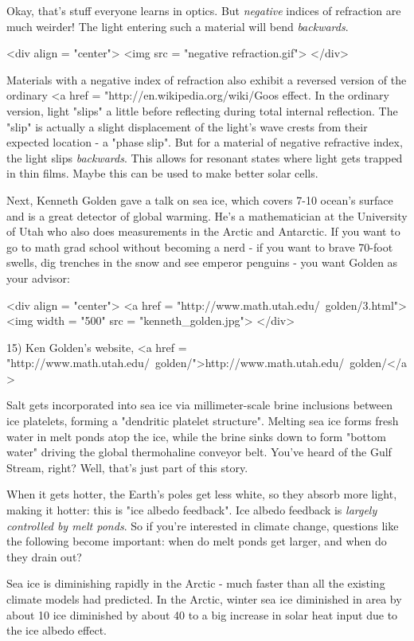 Okay, that's stuff everyone learns in optics.  But \emph{negative}
indices of refraction are much weirder!  The light entering such a
material will bend \emph{backwards}.

<div align = "center">
<img src = "negative refraction.gif">
</div>

Materials with a negative index of refraction also exhibit a reversed
version of the ordinary <a href =
"http://en.wikipedia.org/wiki/Goos%
effect.  In the ordinary version, light "slips" a little
before reflecting during total internal reflection.  The
"slip" is actually a slight displacement of the light's wave
crests from their expected location - a "phase slip".  But
for a material of negative refractive index, the light slips
\emph{backwards}.  This allows for resonant states where light gets
trapped in thin films.  Maybe this can be used to make better solar
cells.

Next, Kenneth Golden gave a talk on sea ice, which covers 7-10%
ocean's surface and is a great detector of global warming.  He's a
mathematician at the University of Utah who also does measurements in
the Arctic and Antarctic.  If you want to go to math grad school
without becoming a nerd - if you want to brave 70-foot swells, dig
trenches in the snow and see emperor penguins - you want Golden as
your advisor:

<div align = "center">
<a href = "http://www.math.utah.edu/~golden/3.html">
<img width = "500" src = "kenneth_golden.jpg">
</div>

15) Ken Golden's website, <a href =
"http://www.math.utah.edu/~golden/">http://www.math.utah.edu/~golden/</a>

Salt gets incorporated into sea ice via millimeter-scale brine
inclusions between ice platelets, forming a "dendritic platelet
structure".  Melting sea ice forms fresh water in melt ponds atop the
ice, while the brine sinks down to form "bottom water" driving the
global thermohaline conveyor belt.  You've heard of the Gulf Stream,
right?  Well, that's just part of this story.

When it gets hotter, the Earth's poles get less white, so they absorb
more light, making it hotter: this is "ice albedo feedback".  Ice
albedo feedback is \emph{largely controlled by melt ponds}.  So if you're
interested in climate change, questions like the following become 
important: when do melt ponds get larger, and when do they drain out?

Sea ice is diminishing rapidly in the Arctic - much faster than all
the existing climate models had predicted.   In the Arctic, winter sea
ice diminished in area by about 10%
ice diminished by about 40%
to a big increase in solar heat input due to the ice
albedo effect.   

